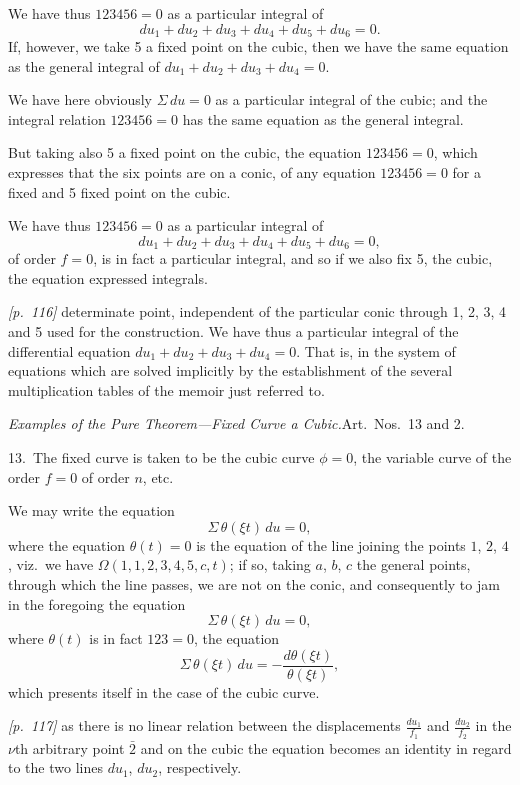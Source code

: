 \documentclass[11pt,a4paper]{article}
\theoremstyle{plain}
\theoremstyle{definition}
\theoremstyle{remark}
\begin{document}
We have thus $123456 = 0$ as a particular integral of
\[
du_1 + du_2 + du_3 + du_4 + du_5 + du_6 = 0.
\]
If, however, we take 5 a fixed point on the cubic, then we have the same equation as the general integral of $du_1 + du_2 + du_3 + du_4 = 0$.

We have here obviously $\Sigma\,du = 0$ as a particular integral of the cubic; and the integral relation $123456 = 0$ has the same equation as the general integral.

But taking also 5 a fixed point on the cubic, the equation $123456 = 0$, which expresses that the six points are on a conic, of any equation $123456 = 0$ for a fixed and 5 fixed point on the cubic.

We have thus $123456 = 0$ as a particular integral of
\[
du_1 + du_2 + du_3 + du_4 + du_5 + du_6 = 0,
\]
of order $f = 0$, is in fact a particular integral, and so if we also fix 5, the cubic, the equation expressed integrals.

\bigskip\noindent\textit{[p.~116]} determinate point, independent of the particular conic through 1, 2, 3, 4 and 5 used for the construction. We have thus a particular integral of the differential equation $du_1 + du_2 + du_3 + du_4 = 0$. That is, in the system of equations which are solved implicitly by the establishment of the several multiplication tables of the memoir just referred to.

\textit{Examples of the Pure Theorem---Fixed Curve a Cubic.}\quad Art.\ Nos.\ 13 and 2.

13.\ The fixed curve is taken to be the cubic curve $\phi = 0$, the variable curve of the order $f = 0$ of order $n$, etc.

We may write the equation
\[
\Sigma\,\theta(\xi t)\,du = 0,
\]
where the equation $\theta(t) = 0$ is the equation of the line joining the points $1$, $2$, $4$, viz.\ we have $\Omega(1, 1, 2, 3, 4, 5, c, t)$; if so, taking $a$, $b$, $c$ the general points, through which the line passes, we are not on the conic, and consequently to jam in the foregoing the equation
\[
\Sigma\,\theta(\xi t)\,du = 0,
\]
where $\theta(t)$ is in fact $123 = 0$, the equation
\[
\Sigma\,\theta(\xi t)\,du = -\frac{d\theta(\xi t)}{\theta(\xi t)},
\]
which presents itself in the case of the cubic curve.

\bigskip\noindent\textit{[p.~117]} as there is no linear relation between the displacements $\frac{du_1}{f_1}$ and $\frac{du_2}{f_2}$ in the $\nu$th arbitrary point $\bar{2}$ and on the cubic the equation becomes an identity in regard to the two lines $du_1$, $du_2$, respectively.
\end{document}
